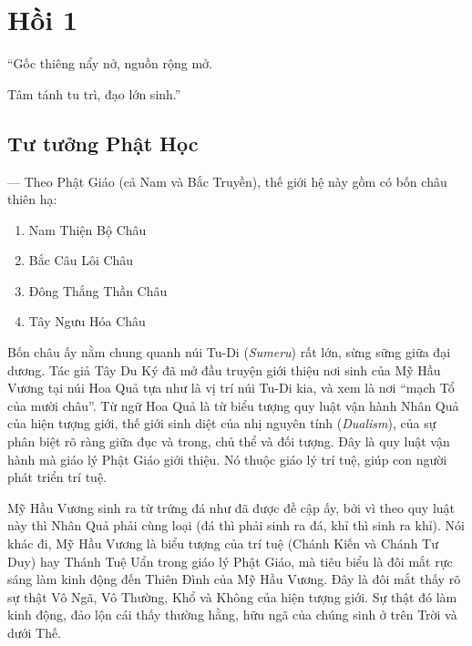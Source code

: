 \chapter{Hồi 1} %
\label{cha:hoi_thu_1}

\begin{itshape}
``Gốc thiêng nẩy nở, nguồn rộng mở.

Tâm tánh tu trì, đạo lớn sinh.''
\end{itshape}

\section{Tư tưởng Phật Học} %
\label{sec:hoi_1_tu_tuong_phat_hoc}

— Theo Phật Giáo (cả Nam và Bắc Truyền), thế giới hệ này gồm có bốn châu thiên hạ:

\begin{multicols}{2}
\begin{enumerate}[label=\itshape\arabic*\upshape/]
    \item Nam Thiện Bộ Châu

    \item Bắc Câu Lôi Châu

    \item Đông Thắng Thần Châu

    \item Tây Ngưu Hóa Châu
\end{enumerate}
\end{multicols}

Bốn châu ấy nằm chung quanh núi Tu-Di (\emph{Sumeru}) rất lớn, sừng sững giữa đại dương. Tác giả Tây Du Ký đã mở đầu truyện giới thiệu nơi sinh của Mỹ Hầu Vương tại núi Hoa Quả tựa như là vị trí núi Tu-Di kia, và xem là nơi ``mạch Tổ của mười châu''. Từ ngữ Hoa Quả là từ biểu tượng quy luật vận hành Nhân Quả của hiện tượng giới, thế giới sinh diệt của nhị nguyên tính (\emph{Dualism}), của sự phân biệt rõ ràng giữa đục và trong, chủ thể và đối tượng. Đây là quy luật vận hành mà giáo lý Phật Giáo giới thiệu. Nó thuộc giáo lý trí tuệ, giúp con người phát triển trí tuệ.

Mỹ Hầu Vương sinh ra từ trứng đá như đã được đề cập ấy, bởi vì theo quy luật này thì Nhân Quả phải cùng loại (đá thì phải sinh ra đá, khỉ thì sinh ra khỉ). Nói khác đi, Mỹ Hầu Vương là biểu tượng của trí tuệ (Chánh Kiến và Chánh Tư Duy) hay Thánh Tuệ Uẩn trong giáo lý Phật Giáo, mà tiêu biểu là đôi mắt rực sáng làm kinh động đến Thiên Đình của Mỹ Hầu Vương. Đây là đôi mắt thấy rõ sự thật Vô Ngã, Vô Thường, Khổ và Không của hiện tượng giới. Sự thật đó làm kinh động, đảo lộn cái thấy thường hằng, hữu ngã của chúng sinh ở trên Trời và dưới Thế.


